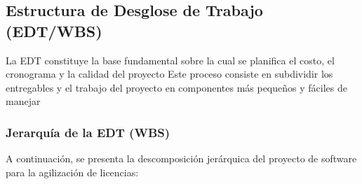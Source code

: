 \subsection{Estructura de Desglose de Trabajo (EDT/WBS)}

La EDT constituye la base fundamental sobre la cual se planifica el costo, el cronograma y la calidad del proyecto Este proceso consiste en subdividir los entregables y el trabajo del proyecto en componentes más pequeños y fáciles de manejar

\subsubsection{Jerarquía de la EDT (WBS)}
A continuación, se presenta la descomposición jerárquica del proyecto de software para la agilización de licencias:

